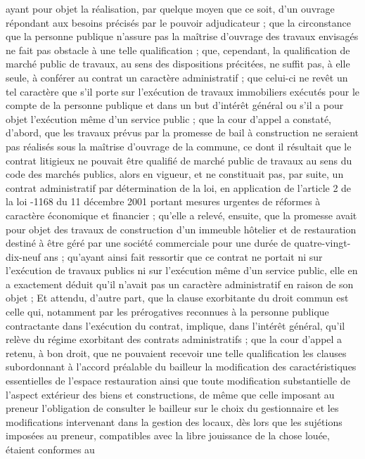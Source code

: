 \documentclass[11pt,a4paper]{report}
\begin{document}
	ayant pour objet la réalisation, par quelque moyen que ce soit, d'un ouvrage répondant aux besoins précisés par
	le pouvoir adjudicateur ; que la circonstance que la personne publique n'assure pas la maîtrise d'ouvrage des
	travaux envisagés ne fait pas obstacle à une telle qualification ; que, cependant, la qualification de marché
	public de travaux, au sens des dispositions précitées, ne suffit pas, à elle seule, à conférer au contrat un
	caractère administratif ; que celui-ci ne revêt un tel caractère que s'il porte sur l'exécution de travaux
	immobiliers exécutés pour le compte de la personne publique et dans un but d'intérêt général ou s'il a pour objet
	l'exécution même d'un service public ; que la cour d'appel a constaté, d'abord, que les travaux prévus par la
	promesse de bail à construction ne seraient pas réalisés sous la maîtrise d'ouvrage de la commune, ce dont il
	résultait que le contrat litigieux ne pouvait être qualifié de marché public de travaux au sens du code des
	marchés publics, alors en vigueur, et ne constituait pas, par suite, un contrat administratif par détermination de
	la loi, en application de l'article 2 de la loi -1168 du 11 décembre 2001 portant mesures urgentes de
	réformes à caractère économique et financier ; qu'elle a relevé, ensuite, que la promesse avait pour objet des
	travaux de construction d'un immeuble hôtelier et de restauration destiné à être géré par une société
	commerciale pour une durée de quatre-vingt-dix-neuf ans ; qu'ayant ainsi fait ressortir que ce contrat ne portait
	ni sur l'exécution de travaux publics ni sur l'exécution même d'un service public, elle en a exactement déduit
	qu'il n'avait pas un caractère administratif en raison de son objet ;
	Et attendu, d'autre part, que la clause exorbitante du droit commun est celle qui, notamment par les prérogatives
	reconnues à la personne publique contractante dans l'exécution du contrat, implique, dans l'intérêt général, qu'il
	relève du régime exorbitant des contrats administratifs ; que la cour d'appel a retenu, à bon droit, que ne
	pouvaient recevoir une telle qualification les clauses subordonnant à l'accord préalable du bailleur la
	modification des caractéristiques essentielles de l'espace restauration ainsi que toute modification substantielle
	de l'aspect extérieur des biens et constructions, de même que celle imposant au preneur l'obligation de consulter
	le bailleur sur le choix du gestionnaire et les modifications intervenant dans la gestion des locaux, dès lors que
	les sujétions imposées au preneur, compatibles avec la libre jouissance de la chose louée, étaient conformes au
\end{document}
